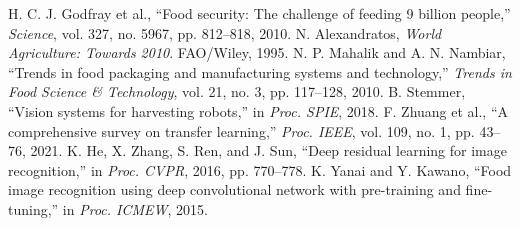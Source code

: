  H. C. J. Godfray et al., ``Food security: The challenge of feeding 9 billion people,'' \textit{Science}, vol. 327, no. 5967, pp. 812--818, 2010.
 N. Alexandratos, \textit{World Agriculture: Towards 2010}. FAO/Wiley, 1995.
 N. P. Mahalik and A. N. Nambiar, ``Trends in food packaging and manufacturing systems and technology,'' \textit{Trends in Food Science \& Technology}, vol. 21, no. 3, pp. 117--128, 2010.
 B. Stemmer, ``Vision systems for harvesting robots,'' in \textit{Proc. SPIE}, 2018.
 F. Zhuang et al., ``A comprehensive survey on transfer learning,'' \textit{Proc. IEEE}, vol. 109, no. 1, pp. 43--76, 2021.
 K. He, X. Zhang, S. Ren, and J. Sun, ``Deep residual learning for image recognition,'' in \textit{Proc. CVPR}, 2016, pp. 770--778.
 K. Yanai and Y. Kawano, ``Food image recognition using deep convolutional network with pre-training and fine-tuning,'' in \textit{Proc. ICMEW}, 2015.
